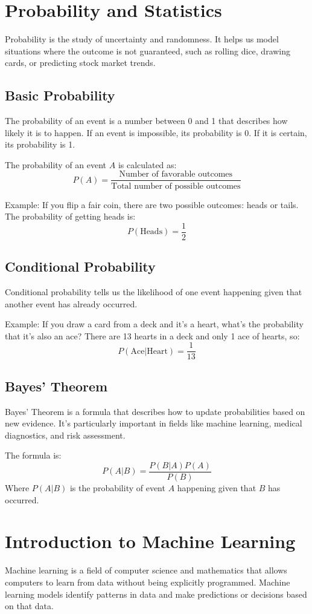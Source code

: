 \section{Probability and Statistics}
Probability is the study of uncertainty and randomness. It helps us model situations where the outcome is not guaranteed, such as rolling dice, drawing cards, or predicting stock market trends.

\subsection{Basic Probability}
The probability of an event is a number between 0 and 1 that describes how likely it is to happen. If an event is impossible, its probability is 0. If it is certain, its probability is 1.

The probability of an event \(A\) is calculated as:
\[
P(A) = \frac{\text{Number of favorable outcomes}}{\text{Total number of possible outcomes}}
\]

Example: If you flip a fair coin, there are two possible outcomes: heads or tails. The probability of getting heads is:
\[
P(\text{Heads}) = \frac{1}{2}
\]

\subsection{Conditional Probability}
Conditional probability tells us the likelihood of one event happening given that another event has already occurred.

Example: If you draw a card from a deck and it's a heart, what’s the probability that it’s also an ace? There are 13 hearts in a deck and only 1 ace of hearts, so:
\[
P(\text{Ace} | \text{Heart}) = \frac{1}{13}
\]

\subsection{Bayes’ Theorem}
Bayes’ Theorem is a formula that describes how to update probabilities based on new evidence. It’s particularly important in fields like machine learning, medical diagnostics, and risk assessment.

The formula is:
\[
P(A|B) = \frac{P(B|A)P(A)}{P(B)}
\]
Where \(P(A|B)\) is the probability of event \(A\) happening given that \(B\) has occurred.

\section{Introduction to Machine Learning}
Machine learning is a field of computer science and mathematics that allows computers to learn from data without being explicitly programmed. Machine learning models identify patterns in data and make predictions or decisions based on that data.

